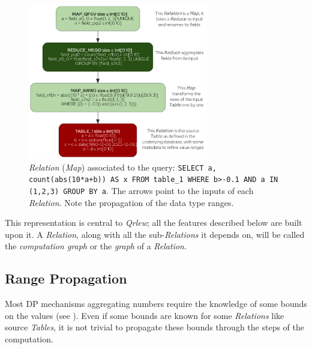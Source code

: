 \documentclass{article}
\newcommand{\qrlew}{\emph{Qrlew}}
\begin{document}
    \begin{figure}[t]
        \centering
        \includegraphics[width=0.7\textwidth]{figures/relation}
        \caption{\emph{Relation} (\emph{Map}) associated to the query: \texttt{SELECT a, count(abs(10*a+b)) AS x FROM table\_1 WHERE b>-0.1 AND a IN (1,2,3) GROUP BY a}. The arrows point to the inputs of each \emph{Relation}. Note the propagation of the data type ranges.}
        \label{process}
    \end{figure}
    
    This representation is central to \qrlew{}; all the features described below are built upon it. A \emph{Relation}, along with all the sub-\emph{Relations} it depends on, will be called the \emph{computation graph} or the \emph{graph} of a \emph{Relation}.
    
    \subsection{Range Propagation}
    \label{sec:range_propagation}
    
    Most DP mechanisms aggregating numbers require the knowledge of some bounds on the values (see \cite{dwork2014algorithmic}).
    Even if some bounds are known for some \emph{Relations} like source \emph{Tables}, it is not trivial to propagate these bounds through the steps of the computation.
    
\end{document}
